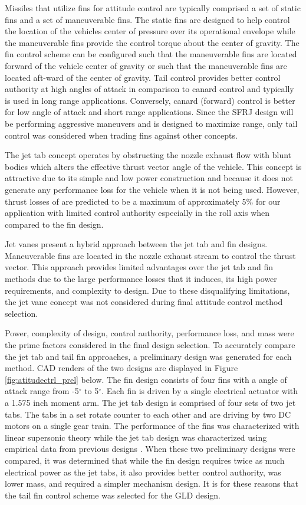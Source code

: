 Missiles that utilize fins for attitude control are typically comprised a set of static fins and a set of maneuverable fins. The static fins are designed to help control the location of the vehicles center of pressure over its operational envelope while the maneuverable fins provide the control torque about the center of gravity. The fin control scheme can be configured such that the maneuverable fins are located forward of the vehicle center of gravity or such that the maneuverable fins are located aft-ward of the center of gravity. Tail control provides better control authority at high angles of attack in comparison to canard control and typically is used in long range applications. Conversely, canard (forward) control is better for low angle of attack and short range applications. Since the SFRJ design will be performing aggressive maneuvers and is designed to maximize range, only tail control was considered when trading fins against other concepts.

The jet tab concept operates by obstructing the nozzle exhaust flow with blunt bodies which alters the effective thrust vector angle of the vehicle. This concept is attractive due to its simple and low power construction and because it does not generate any performance loss for the vehicle when it is not being used. However, thrust losses of are predicted to be a maximum of approximately 5\% for our application \cite{eatough1977} with limited control authority especially in the roll axis when compared to the fin design.

Jet vanes present a hybrid approach between the jet tab and fin designs. Maneuverable fins are located in the nozzle exhaust stream to control the thrust vector. This approach provides limited advantages over the jet tab and fin methods due to the large performance losses that it induces, its high power requirements, and complexity to design. Due to these disqualifying limitations, the jet vane concept was not considered during final attitude control method selection.

Power, complexity of design, control authority, performance loss, and mass were the prime factors considered in the final design selection. To accurately compare the jet tab and tail fin approaches, a preliminary design was generated for each method. CAD renders of the two designs are displayed in Figure \ref{fig:atitudectrl_prel} below. The fin design consists of four fins with a angle of attack range from -5$^\circ$ to 5$^\circ$. Each fin is driven by a single electrical actuator with a 1.575 inch moment arm. The jet tab design is comprised of four sets of two jet tabs. The tabs in a set rotate counter to each other and are driving by two DC motors on a single gear train. The performance of the fins was characterized with linear supersonic theory while the jet tab design was characterized using empirical data from previous designs \cite{eatough1977}. When these two preliminary designs were compared, it was determined that while the fin design requires twice as much electrical power as the jet tabs, it also provides better control authority, was lower mass, and required a simpler mechanism design. It is for these reasons that the tail fin control scheme was selected for the GLD design.

